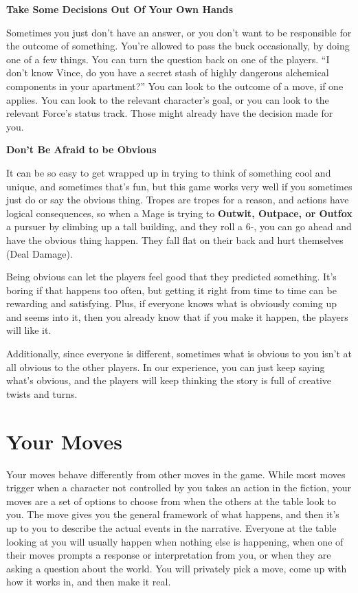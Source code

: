 \documentclass[
  oneside,
  statementpaper,
  9pt]{memoir}
\begin{document}
\textbf{Take Some Decisions Out Of Your Own Hands}

Sometimes you just don't have an answer, or you don't want to be
responsible for the outcome of something. You're allowed to pass the
buck occasionally, by doing one of a few things. You can turn the
question back on one of the players. ``I don't know Vince, do you have a
secret stash of highly dangerous alchemical components in your
apartment?'' You can look to the outcome of a move, if one applies. You
can look to the relevant character's goal, or you can look to the
relevant Force's status track. Those might already have the decision
made for you.

\textbf{Don't Be Afraid to be Obvious}

It can be so easy to get wrapped up in trying to think of something cool
and unique, and sometimes that's fun, but this game works very well if
you sometimes just do or say the obvious thing. Tropes are tropes for a
reason, and actions have logical consequences, so when a Mage is trying
to \textbf{Outwit, Outpace, or Outfox} a pursuer by climbing up a tall
building, and they roll a 6-, you can go ahead and have the obvious
thing happen. They fall flat on their back and hurt themselves (Deal
Damage).

Being obvious can let the players feel good that they predicted
something. It's boring if that happens too often, but getting it right
from time to time can be rewarding and satisfying. Plus, if everyone
knows what is obviously coming up and seems into it, then you already
know that if you make it happen, the players will like it.

Additionally, since everyone is different, sometimes what is obvious to
you isn't at all obvious to the other players. In our experience, you
can just keep saying what's obvious, and the players will keep thinking
the story is full of creative twists and turns.

\hypertarget{your-moves}{%
\section{Your Moves}\label{your-moves}}

Your moves behave differently from other moves in the game. While most
moves trigger when a character not controlled by you takes an action in
the fiction, your moves are a set of options to choose from when the
others at the table look to you. The move gives you the general
framework of what happens, and then it's up to you to describe the
actual events in the narrative. Everyone at the table looking at you
will usually happen when nothing else is happening, when one of their
moves prompts a response or interpretation from you, or when they are
asking a question about the world. You will privately pick a move, come
up with how it works in, and then make it real.
\end{document}
